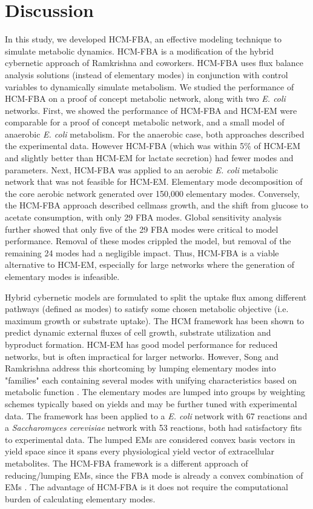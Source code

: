 \documentclass[10pt,twocolumn,twoside,final]{IEEEtran}
\begin{document}
\section{Discussion}
In this study, we developed HCM-FBA, an effective modeling technique to simulate metabolic dynamics.
HCM-FBA is a modification of the hybrid cybernetic approach of Ramkrishna and coworkers.
HCM-FBA uses flux balance analysis solutions (instead of elementary modes) in conjunction with control variables to dynamically simulate metabolism.
We studied the performance of HCM-FBA on a proof of concept metabolic network, along with two \emph{E. coli} networks.
First, we showed the performance of HCM-FBA and HCM-EM were comparable for a proof of concept metabolic network, and a small model of anaerobic \textit{E. coli} metabolism.
For the anaerobic case, both approaches described the experimental data.
However HCM-FBA (which was within 5\% of HCM-EM and slightly better than HCM-EM for lactate secretion) had fewer modes and parameters.
Next, HCM-FBA was applied to an aerobic \textit{E. coli} metabolic network that was not feasible for HCM-EM.
Elementary mode decomposition of the core aerobic network generated over 150,000 elementary modes.
Conversely, the HCM-FBA approach described cellmass growth, and the shift from glucose to acetate consumption, with only 29 FBA modes.
Global sensitivity analysis further showed that only five of the 29 FBA modes were critical to model performance.
Removal of these modes crippled the model, but removal of the remaining 24 modes had a negligible impact.
Thus, HCM-FBA is a viable alternative to HCM-EM, especially for large networks where the generation of elementary modes is infeasible.

Hybrid cybernetic models are formulated to split the uptake flux among different pathways (defined as modes) to satisfy some chosen metabolic objective (i.e. maximum growth or substrate uptake).
The HCM framework has been shown to predict dynamic external fluxes of cell growth, substrate utilization and byproduct formation. 
HCM-EM has good model performance for reduced networks, but is often impractical for larger networks.
However, Song and Ramkrishna address this shortcoming by lumping elementary modes into "families" each containing several modes with unifying characteristics based on metabolic function \cite{2010_song,Song:2011aa}.
The elementary modes are lumped into groups by weighting schemes typically based on yields and may be further tuned with experimental data.
The framework has been applied to a \textit{E. coli} network with 67 reactions and a \textit{Saccharomyces cerevisiae} network with 53 reactions, both had satisfactory fits to experimental data.
The lumped EMs are considered convex basis vectors in yield space since it spans every physiological yield vector of extracellular metabolites. 
The HCM-FBA framework is a different approach of reducing/lumping EMs, since the FBA mode is already a convex combination of EMs \cite{Wiback:2003aa}. 
The advantage of HCM-FBA is it does not require the computational burden of calculating elementary modes.
\end{document}
